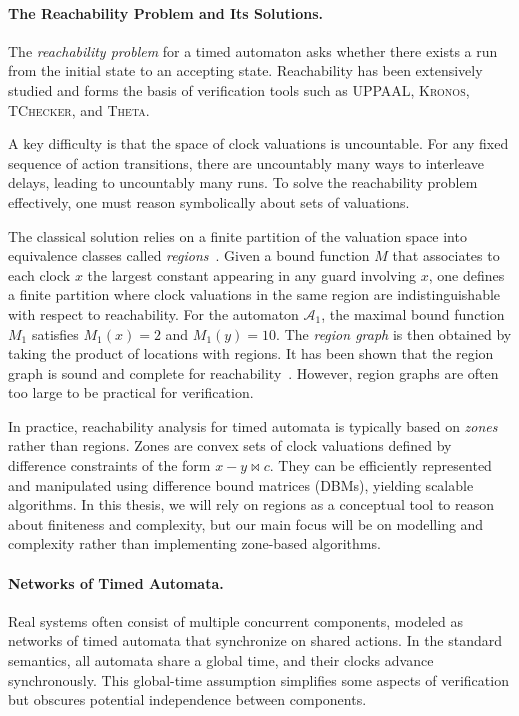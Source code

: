 \paragraph{The Reachability Problem and Its Solutions.}
The \emph{reachability problem} for a timed automaton asks whether there exists a run from the initial state to an accepting state. Reachability has been extensively studied and forms the basis of verification tools such as \textsc{UPPAAL}, \textsc{Kronos}, \textsc{TChecker}, and \textsc{Theta}.

A key difficulty is that the space of clock valuations is uncountable. For any fixed sequence of action transitions, there are uncountably many ways to interleave delays, leading to uncountably many runs. To solve the reachability problem effectively, one must reason symbolically about sets of valuations.

The classical solution relies on a finite partition of the valuation space into equivalence classes called \emph{regions}~\cite{AlurDillTA}. Given a bound function \(M\) that associates to each clock \(x\) the largest constant appearing in any guard involving \(x\), one defines a finite partition where clock valuations in the same region are indistinguishable with respect to reachability. For the automaton \(\mathcal{A}_1\), the maximal bound function \(M_1\) satisfies \(M_1(x) = 2\) and \(M_1(y) = 10\). The \emph{region graph} is then obtained by taking the product of locations with regions. It has been shown that the region graph is sound and complete for reachability~\cite{AlurDillTA}. However, region graphs are often too large to be practical for verification.

In practice, reachability analysis for timed automata is typically based on \emph{zones}~\cite{DillPhD} rather than regions. Zones are convex sets of clock valuations defined by difference constraints of the form \(x - y \bowtie c\). They can be efficiently represented and manipulated using difference bound matrices (DBMs), yielding scalable algorithms. In this thesis, we will rely on regions as a conceptual tool to reason about finiteness and complexity, but our main focus will be on modelling and complexity rather than implementing zone-based algorithms.

\paragraph{Networks of Timed Automata.} Real systems often consist of multiple concurrent components, modeled as networks of timed automata that synchronize on shared actions. In the standard semantics, all automata share a global time, and their clocks advance synchronously. This global-time assumption simplifies some aspects of verification but obscures potential independence between components.

